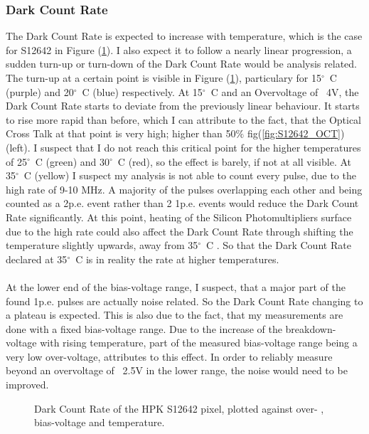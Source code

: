 \documentclass[article,type=msc,colorback,accentcolor=tud9c]{tudthesis}
\begin{document}
\subsubsection{Dark Count Rate}
The Dark Count Rate is expected to increase with temperature, which is the case for S12642 in Figure (\ref{fig:S12642_DCR}). I also expect it to follow a nearly linear progression, a sudden turn-up or turn-down of the Dark Count Rate would be analysis related. The turn-up at a certain point is visible in Figure (\ref{fig:S12642_DCR}), particulary for 15$^{\circ}$~C (purple) and 20$^{\circ}$~C (blue) respectively. At 15$^{\circ}$~C and an Overvoltage of ~4V, the Dark Count Rate starts to deviate from the previously linear behaviour. It starts to rise more rapid than before, which I can attribute to the fact, that the Optical Cross Talk at that point is very high; higher than 50$\%$  fig(\ref{fig:S12642_OCT}) (left). I suspect that I do not reach this critical point for the higher temperatures of 25$^{\circ}$~C (green) and 30$^{\circ}$~C (red), so the effect is barely, if not at all visible. At 35$^{\circ}$~C (yellow) I suspect my analysis is not able to count every pulse, due to the high rate of 9-10 MHz. A majority of the pulses overlapping each other and being counted as a 2p.e. event rather than 2 1p.e. events would reduce the Dark Count Rate significantly. At this point, heating of the Silicon Photomultipliers surface due to the high rate could also affect the Dark Count Rate through shifting the temperature slightly upwards, away from 35${^\circ}$~C . So that the Dark Count Rate declared at 35${^\circ}$~C is in reality the rate at higher temperatures. \\\\At the lower end of the bias-voltage range, I suspect, that a major part of the found 1p.e. pulses are actually noise related. So the Dark Count Rate changing to a plateau is expected. This is also due to the fact, that my measurements are done with a fixed bias-voltage range. Due to the increase of the breakdown-voltage with rising temperature, part of the measured bias-voltage range being a very low over-voltage, attributes to this effect. In order to reliably measure beyond an overvoltage of ~2.5V in the lower range, the noise would need to be improved.  
\begin{figure}[h]
\begin{centering}
\caption{Dark Count Rate of the HPK S12642 pixel, plotted against over- , bias-voltage and temperature. }
\label{fig:S12642_DCR}
\end{centering}
\end{figure}
\end{document}

